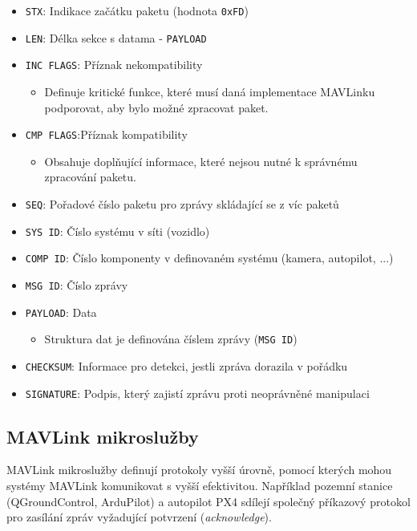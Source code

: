\begin{itemize}
    \item \texttt{STX}: Indikace začátku paketu (hodnota \texttt{0xFD})
    \item \texttt{LEN}: Délka sekce s datama - \texttt{PAYLOAD}
    \item \texttt{INC FLAGS}: Příznak nekompatibility
    \begin{itemize}
        \item Definuje kritické funkce, které musí daná implementace MAVLinku podporovat, aby bylo možné zpracovat paket.
    \end{itemize}
    \item \texttt{CMP FLAGS}:Příznak kompatibility
    \begin{itemize}
        \item Obsahuje doplňující informace, které nejsou nutné k správnému zpracování paketu.
    \end{itemize}
    \item \texttt{SEQ}: Pořadové číslo paketu pro zprávy skládající se z víc paketů
    \item \texttt{SYS ID}: Číslo systému v síti (vozidlo)
    \item \texttt{COMP ID}: Číslo komponenty v definovaném systému (kamera, autopilot, ...)
    \item \texttt{MSG ID}: Číslo zprávy
    \item \texttt{PAYLOAD}: Data
    \begin{itemize}
        \item Struktura dat je definována číslem zprávy (\texttt{MSG ID})
    \end{itemize}
    \item \texttt{CHECKSUM}: Informace pro detekci, jestli zpráva dorazila v pořádku
    \item \texttt{SIGNATURE}: Podpis, který zajistí zprávu proti neoprávněné manipulaci
\end{itemize}

\subsection{MAVLink mikroslužby}

MAVLink mikroslužby definují protokoly vyšší úrovně, pomocí kterých mohou systémy MAVLink komunikovat s vyšší efektivitou. Například pozemní stanice (QGroundControl, ArduPilot) a autopilot PX4 sdílejí společný příkazový protokol pro zasílání zpráv vyžadující potvrzení (\textit{acknowledge}).

